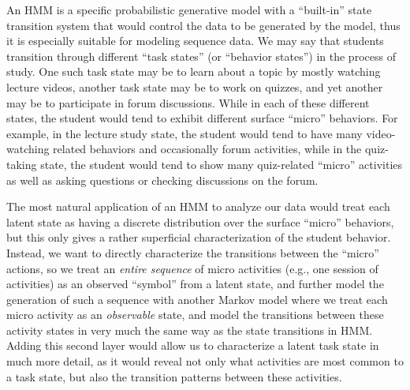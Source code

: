 An HMM is a specific probabilistic generative model with a ``built-in''
state transition system that would control the data to be generated by the
model, thus it is especially suitable for modeling sequence
data. We may say that students transition through different ``task states''
(or ``behavior states'')  in the process of study.  One such task state may
be to learn about a topic by mostly watching lecture videos, another task
state may be to work on quizzes, and yet another may be to participate in
forum discussions. While in each of these different states, the student
would tend to exhibit different surface ``micro'' behaviors.  For example,
in the lecture study state, the student would tend to have many
video-watching related behaviors and occasionally forum activities, while
in the quiz-taking state, the student would tend to show many quiz-related
``micro'' activities as well as asking questions or checking discussions on
the forum.

The most natural application of an HMM to analyze our data would treat each
latent state as having a discrete distribution over the surface ``micro''
behaviors, but this only gives a rather superficial characterization of the
student behavior. Instead, we want to directly characterize the transitions
between the ``micro'' actions, so we treat an {\em entire
sequence} of micro activities (e.g., one session of activities) as an
observed ``symbol'' from a latent state, and further model the generation
of such a sequence with another Markov model where we treat each micro
activity as an {\em observable} state, and model the transitions between
these activity states in very much the same way as the state transitions in
HMM. Adding this second layer would allow us to characterize a latent task
state in much more detail, as it would reveal not only what activities are
most common to a task state, but also the transition patterns between these
activities.
